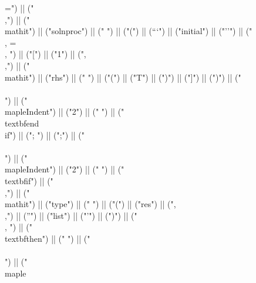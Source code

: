 \documentclass{article}
\begin{document}
\begin{center}
\begin{maplelatex}
{=") || ("\\,") || ("\\mathit{") || ("solnproc") || ("} ") || ("(") || ("``") || ("initial") || ("''") || (" \\, = \\, ") || ("[") || ("1") || (",\\,") || ("\\mathit{") || ("rhs") || ("} ") || ("(") || ("T") || (")") || ("]") || (")") || ("\\\\\n") || ("\\mapleIndent{") || ("2") || ("} ") || ("\\textbf{end\\ if}") || ("; ") || (";") || ("\\\\\n") || ("\\mapleIndent{") || ("2") || ("} ") || ("\\textbf{if}") || (" \\,") || ("\\mathit{") || ("type") || ("} ") || ("(") || ("res") || (",\\,") || ("'") || ("list") || ("'") || (")") || (" \\, ") || ("\\textbf{then}") || (" ") || ("\\\\\n") || ("\\maple}
\end{maplelatex}
\end{center}
\end{document}
